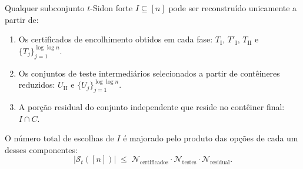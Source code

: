 \documentclass[reqno,a4paper,12pt]{amsart}
\begin{document}
Qualquer subconjunto $t$-Sidon forte $I \subseteq [n]$ pode ser reconstruído unicamente a partir de:
\begin{enumerate}
  \item Os certificados de encolhimento obtidos em cada fase: $T_{\mathrm{I}}$, $T'_{\mathrm{I}}$, $T_{\mathrm{II}}$ e $\{T_j\}_{j=1}^{\log\log n}$.
  \item Os conjuntos de teste intermediários selecionados a partir de contêineres reduzidos: $U_{\mathrm{II}}$ e $\{U_j\}_{j=1}^{\log\log n}$.
  \item A porção residual do conjunto independente que reside no contêiner final: $I \cap C$.
\end{enumerate}

O número total de escolhas de $I$ é majorado pelo produto das opções de cada um desses componentes:
\[
  |\mathcal{S}_t([n])| \;\le\; \mathcal{N}_{\text{certificados}} \cdot \mathcal{N}_{\text{testes}} \cdot \mathcal{N}_{\text{residual}}.
\]
\end{document}
